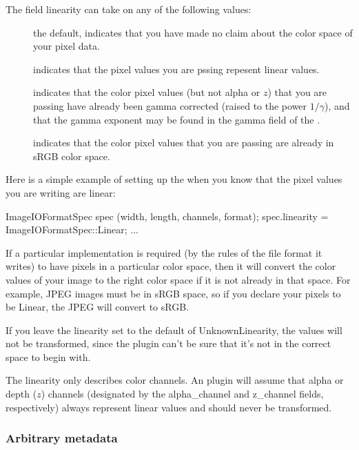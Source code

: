 The \ImageIOFormatSpec field {\cf linearity} can take on any of the
following values:
\begin{description}
\item[\halfspc \rm {}] the default,
  indicates that you have made no claim about the color space of your
  pixel data.
\item[\halfspc \rm {}] indicates that the pixel
  values you are pssing repesent linear values.
\item[\halfspc \rm {}] indicates that the
  color pixel values (but not alpha or $z$) that you are passing have
  already been gamma corrected (raised to the power $1/\gamma$), and
  that the gamma exponent may be found in the {\cf gamma} field of the
  \ImageIOFormatSpec.
\item[\halfspc \rm {}] indicates that the color pixel
  values that you are passing are already in sRGB color space.
\end{description}

\noindent Here is a simple example of setting up the \ImageIOFormatSpec
when you know that the pixel values you are writing are linear:

\begin{code}
        ImageIOFormatSpec spec (width, length, channels, format);
        spec.linearity = ImageIOFormatSpec::Linear;
        ...
\end{code}

If a particular \ImageOutput implementation is required (by the rules of
the file format it writes) to have pixels in a particular color space,
then it will convert the color values of your image to the right color
space if it is not already in that space.  For example, JPEG images
must be in sRGB space, so if you declare your pixels to be {\kw Linear},
the JPEG \ImageOutput will convert to sRGB.

If you leave the linearity set to the default of {\cf UnknownLinearity},
the values will not be transformed, since the plugin can't be sure that
it's not in the correct space to begin with.  

The linearity only describes color channels.  An \ImageOutput plugin
will assume that alpha or depth ($z$) channels (designated by the {\cf
  alpha_channel} and {\cf z_channel} fields, respectively) always
represent linear values and should never be transformed.


\subsubsection{Arbitrary metadata}

